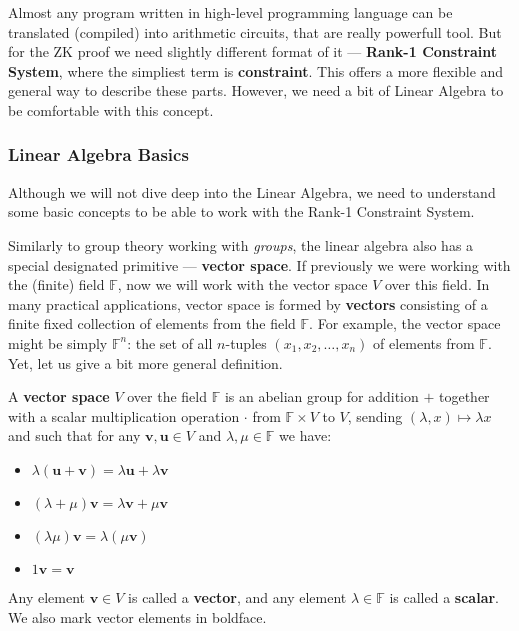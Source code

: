 \documentclass[../lecture-notes.tex]{subfiles}
\begin{document}
Almost any program written in high-level programming language can be translated (compiled) into
arithmetic circuits, that are really powerfull tool. But for the ZK proof we need slightly different
format of it --- \textbf{Rank-1 Constraint System}, where the simpliest term is \textbf{constraint}. 
This offers a more flexible and general way to describe these parts. However, we need a bit of 
Linear Algebra to be comfortable with this concept.

\subsubsection{Linear Algebra Basics}

Although we will not dive deep into the Linear Algebra, we need to understand some basic concepts to
be able to work with the Rank-1 Constraint System.

Similarly to group theory working with \textit{groups}, the linear algebra also has a special designated primitive --- \textbf{vector space}. If previously we were working
with the (finite) field $\mathbb{F}$, now we will work with the vector space $V$ over this field. In many practical applications,
vector space is formed by \textbf{vectors} consisting of a finite fixed collection of elements from the field $\mathbb{F}$. For example,
the vector space might be simply $\mathbb{F}^n$: the set of all $n$-tuples $(x_1,x_2,\dots,x_n)$ of elements from $\mathbb{F}$. Yet, let us give a bit more general definition.

\begin{definition}
    A \textbf{vector space} $V$ over the field $\mathbb{F}$ is an abelian group for addition $+$ together with a scalar multiplication operation $\cdot$ from $\mathbb{F} \times V$ to $V$, sending $(\lambda,x) \mapsto \lambda x$ and such that for any $\mathbf{v},\mathbf{u} \in V$ and $\lambda,\mu \in \mathbb{F}$ we have:
    \begin{itemize}
        \item $\lambda(\mathbf{u}+\mathbf{v}) = \lambda \mathbf{u} + \lambda \mathbf{v}$
        \item $(\lambda + \mu)\mathbf{v} = \lambda \mathbf{v} + \mu \mathbf{v}$
        \item $(\lambda \mu)\mathbf{v} = \lambda(\mu \mathbf{v})$
        \item $1\mathbf{v} = \mathbf{v}$
    \end{itemize}

    Any element $\mathbf{v} \in V$ is called a \textbf{vector}, and any element $\lambda \in \mathbb{F}$ is called a \textbf{scalar}. We also mark vector elements in boldface.
\end{definition}
\end{document}
